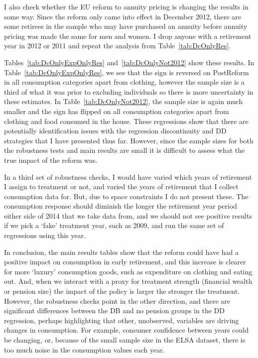 \documentclass[12pt]{article}
\begin{document}
I also check whether the EU reform to annuity pricing is changing the results in
some way. Since the reform only came into effect in December 2012, there are some
retirees in the sample who may have purchased an annuity before
annuity pricing was made the same for men and women. I drop anyone with a
retirement year in 2012 or 2011 and repeat the analysis from Table~\ref{tab:DcOnlyRes}.

Tables~\ref{tab:DcOnlyExpOnlyRes} and~\ref{tab:DcOnlyNot2012} show these
results. In Table~\ref{tab:DcOnlyExpOnlyRes}, we see that the sign is reversed on
PostReform in all consumption categories apart from clothing, however the sample
size is a third of what it was prior to excluding individuals so there is more
uncertainty in these estimates. In Table~\ref{tab:DcOnlyNot2012}, the sample
size is again much smaller and the sign has flipped on all consumption
categories apart from clothing and food consumed in the house. These regressions
show that there are potentially identification issues with the regression
discontinuity and DD strategies that I have presented thus far. However, since
the sample sizes for both the robustness tests and main results are small it is
difficult to assess what the true impact of the reform was.

In a third set of robustness checks, I would have varied which years of
retirement I assign to treatment or not, and varied the years of retirement that
I collect consumption data for. But, due to space constraints I do not present
these. The consumption response should diminish the longer the retirement year
period either side of 2014 that we take data from, and we should not see
positive results if we pick a `fake' treatment year, such as 2009, and run the
same set of regressions using this year.

In conclusion, the main results tables show that the reform could have had a
positive impact on consumption in early retirement, and this increase is clearer
for more `luxury' consumption goods, such as expenditure on clothing and eating
out. And, when we interact with a proxy for treatment strength (financial wealth
or pension size) the impact of the policy is larger the stronger the treatment.
However, the robustness checks point in the other direction, and there are
significant differences between the DB and no pension groups in the DD
regression, perhaps highlighting that other, unobserved, variables are driving
changes in consumption. For example, consumer confidence between years could be
changing, or, because of the small sample size in the ELSA dataset, there is too
much noise in the consumption values each year.
\end{document}
